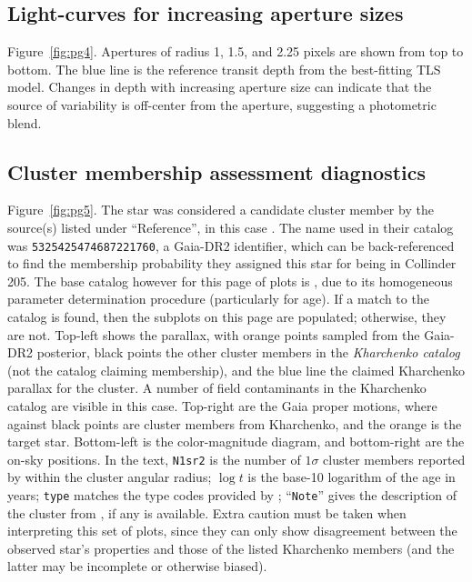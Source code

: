 \documentclass[12pt,twocolumn,tighten]{aastex62}
\begin{document}
\subsection{Light-curves for increasing aperture sizes}
\label{sec:pg4}

Figure~\ref{fig:pg4}.
Apertures of radius 1, 1.5, and 2.25 pixels are shown from top to
bottom.  The blue line is the reference transit depth from the
best-fitting TLS model.  Changes in depth with increasing aperture
size can indicate that the source of variability is off-center from
the aperture, suggesting a photometric blend.

\subsection{Cluster membership assessment diagnostics}
\label{sec:pg5}

Figure~\ref{fig:pg5}.
The star was considered a candidate cluster member by the source(s)
listed under ``Reference'', in this case
\citet{cantat-gaudin_gaia_2018}.  The name used in their catalog was
\texttt{5325425474687221760}, a Gaia-DR2 identifier, which can be
back-referenced to find the membership probability they assigned this
star for being in Collinder 205.  The base catalog however for this page
of plots is \citet{Kharchenko_et_al_2013}, due to its homogeneous
parameter determination procedure (particularly for age).  If a match to
the \citet{Kharchenko_et_al_2013} catalog is found, then the subplots on
this page are populated; otherwise, they are not.  Top-left shows the
parallax, with orange points sampled from the Gaia-DR2 posterior, black
points the other cluster members in the {\it Kharchenko catalog} (not
the catalog claiming membership), and the blue line the claimed
Kharchenko parallax for the cluster.  A number of field contaminants in
the Kharchenko catalog are visible in this case.  Top-right are the Gaia
proper motions, where against black points are cluster members from
Kharchenko, and the orange is the target star.  Bottom-left is the
color-magnitude diagram, and bottom-right are the on-sky positions.  In
the text, \texttt{N1sr2} is the number of $1\sigma$ cluster members
reported by \citet{Kharchenko_et_al_2013} within the cluster angular
radius; $\log t$ is the base-10 logarithm of the age in years;
\texttt{type} matches the type codes provided by
\citet{Kharchenko_et_al_2013}; ``\texttt{Note}'' gives the description
of the cluster from \citet{Kharchenko_et_al_2013}, if any is available.
Extra caution must be taken when interpreting this set of plots, since
they can only show disagreement between the observed star's properties
and those of the listed Kharchenko members (and the latter may be
incomplete or otherwise biased).
\end{document}
